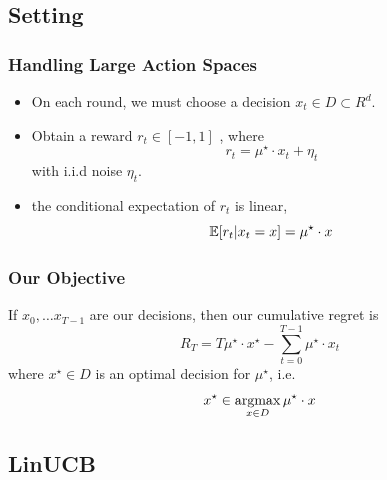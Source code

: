 \documentclass[aspectratio=169]{beamer}
\begin{document}
\subsection{Setting}

\begin{frame}\frametitle{Handling Large Action Spaces}

\begin{itemize}
\item On each round, we must \alert{choose a decision $x_t \in D\subset R^d$}. 
\item Obtain a reward $r_t \in [-1, 1]$ , where
\[
r_t =  \mu^\star \cdot x_t + \eta_t
\]
with i.i.d noise $\eta_t$.
\item the conditional expectation of $r_t$ is linear,
\alert{\[
\mathbb{E}[r_t|x_t=x] = \mu^\star \cdot x 
\]}
\end{itemize}
\end{frame}

\begin{frame}\frametitle{Our Objective}

If $x_0, \ldots x_{T-1}$ are our decisions, then 
our \alert{cumulative regret} is
\[
R_T = T \mu^\star\cdot x^\star - \sum_{t=0}^{T-1} \mu^\star\cdot x_t
\]
where $x^\star \in D$ is an optimal decision for $\mu^\star$, i.e.
\[
x^\star \in \operatorname*{argmax}_{x\in D} \mu^\star \cdot x
\]
\end{frame}


\subsection{LinUCB}

\end{document}
